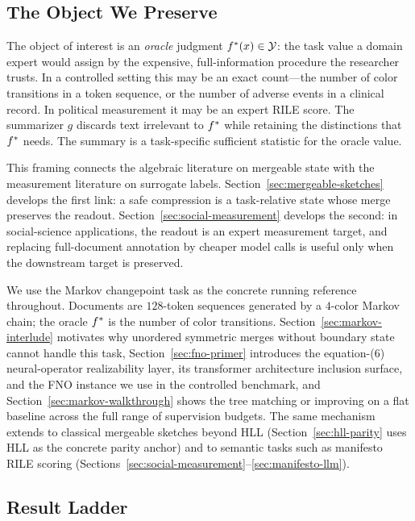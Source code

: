 \subsection{The Object We Preserve}

The object of interest is an \emph{oracle} judgment $f^\ast(x) \in \mathcal{Y}$: the task value a domain expert would assign by the expensive, full-information procedure the researcher trusts. In a controlled setting this may be an exact count---the number of color transitions in a token sequence, or the number of adverse events in a clinical record. In political measurement it may be an expert RILE score. The summarizer $g$ discards text irrelevant to $f^\ast$ while retaining the distinctions that $f^\ast$ needs. The summary is a task-specific sufficient statistic for the oracle value.

This framing connects the algebraic literature on mergeable state with the
measurement literature on surrogate labels. Section~\ref{sec:mergeable-sketches}
develops the first link: a safe compression is a task-relative state whose
merge preserves the readout. Section~\ref{sec:social-measurement} develops
the second: in social-science applications, the readout is an expert
measurement target, and replacing full-document annotation by cheaper model
calls is useful only when the downstream target is preserved.

We use the Markov changepoint task as the concrete running reference throughout. Documents are $128$-token sequences generated by a $4$-color Markov chain; the oracle $f^\ast$ is the number of color transitions. Section~\ref{sec:markov-interlude} motivates why unordered symmetric merges without boundary state cannot handle this task, Section~\ref{sec:fno-primer} introduces the equation-(6) neural-operator realizability layer, its transformer architecture inclusion surface, and the FNO instance we use in the controlled benchmark, and Section~\ref{sec:markov-walkthrough} shows the tree matching or improving on a flat baseline across the full range of supervision budgets. The same mechanism extends to classical mergeable sketches beyond HLL (Section~\ref{sec:hll-parity} uses HLL as the concrete parity anchor) and to semantic tasks such as manifesto RILE scoring (Sections~\ref{sec:social-measurement}--\ref{sec:manifesto-llm}).

\subsection{Result Ladder}

